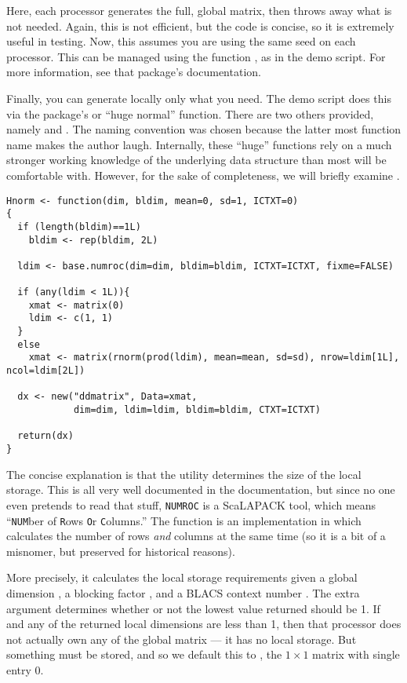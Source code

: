 Here, each processor generates the full, global matrix, then throws away what is not needed.  Again, this is not efficient, but the code is concise, so it is extremely useful in testing.  Now, this assumes you are using the same seed on each processor.  This can be managed using the  function , as in the demo script.  For more information, see that package's documentation.

Finally, you can generate locally only what you need.  The demo script does this via the  package's  or ``huge normal'' function.  There are two others provided, namely  and .  The naming convention was chosen because the latter most function name makes the author laugh.  Internally, these ``huge'' functions rely on a much stronger working knowledge of the underlying data structure than most will be comfortable with.  However, for the sake of completeness, we will briefly examine .

\begin{lstlisting}[language=rr,title=Hnorm()]
Hnorm <- function(dim, bldim, mean=0, sd=1, ICTXT=0)
{
  if (length(bldim)==1L)
    bldim <- rep(bldim, 2L)
  
  ldim <- base.numroc(dim=dim, bldim=bldim, ICTXT=ICTXT, fixme=FALSE)
    
  if (any(ldim < 1L)){
    xmat <- matrix(0)
    ldim <- c(1, 1)
  }
  else
    xmat <- matrix(rnorm(prod(ldim), mean=mean, sd=sd), nrow=ldim[1L], ncol=ldim[2L])
              
  dx <- new("ddmatrix", Data=xmat,
            dim=dim, ldim=ldim, bldim=bldim, CTXT=ICTXT)
            
  return(dx)
}
\end{lstlisting}

The concise explanation is that the  utility determines the size of the local storage.  This is all very well documented in the  documentation, but since no one even pretends to read that stuff, \texttt{NUMROC} is a ScaLAPACK tool, which means ``\texttt{NUM}ber of \texttt{R}ows \texttt{O}r \texttt{C}olumns.''  The function  is an implementation in  which calculates the number of rows \emph{and} columns at the same time (so it is a bit of a misnomer, but preserved for historical reasons).  

More precisely, it calculates the local storage requirements given a global dimension , a blocking factor , and a BLACS context number .  The extra argument  determines whether or not the lowest value returned should be 1.  If  and any of the returned local dimensions are less than 1, then that processor does not actually own any of the global matrix --- it has no local storage.  But something must be stored, and so we default this to , the $1\times 1$ matrix with single entry 0.


